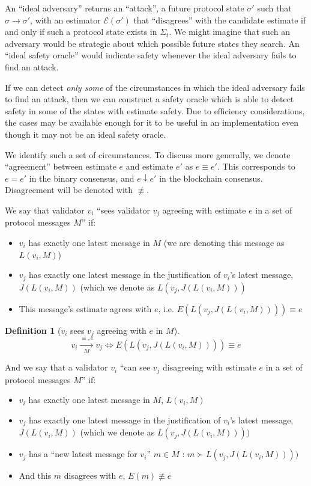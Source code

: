 \documentclass{article}
\theoremstyle{definition}
\newtheorem{defn}{Definition}[section]
\begin{document}
An ``ideal adversary'' returns an ``attack'', a future protocol state $\sigma'$ such that $\sigma \to \sigma'$, with an estimator $\mathcal{E}(\sigma')$ that ``disagrees'' with the candidate estimate if and only if such a protocol state exists in $\Sigma_t$. We might imagine that such an adversary would be strategic about which possible future states they search. An ``ideal safety oracle'' would indicate safety whenever the ideal adversary fails to find an attack.

If we can detect \emph{only some} of the circumstances in which the ideal adversary fails to find an attack, then we can construct a safety oracle which is able to detect safety in some of the states with estimate safety. Due to efficiency considerations, the cases may be available enough for it to be useful in an implementation even though it may not be an ideal safety oracle.

We identify such a set of circumstances. To discuss more generally, we denote ``agreement'' between estimate $e$ and estimate $e'$ as $e \equiv e'$. This corresponds to $e = e'$ in the binary consensus, and $e \downarrow e'$ in the blockchain consensus. Disagreement will be denoted with $\not\equiv$.

We say that validator $v_i$ ``sees validator $v_j$ agreeing with estimate $e$ in a set of protocol messages $M$'' if:
\begin{itemize}
\item $v_i$ has exactly one latest message in $M$ (we are denoting this message as $L(v_i, M)$)
\item $v_j$ has exactly one latest message in the justification of $v_i$'s latest message, $J(L(v_i, M))$ (which we denote as $L(v_j, J(L(v_i, M)))$
\item This message's estimate agrees with $e$, i.e. $E(L(v_j, J(L(v_i, M)))) \equiv e$
\end{itemize}

\begin{defn}[$v_i$ sees $v_j$ agreeing with $e$ in $M$]
$$
v_i \xrightarrow[\text{$M$}]{\text{$\equiv, e$}} v_j \iff E(L(v_j, J(L(v_i, M)))) \equiv e
$$
\end{defn}

And we say that a validator $v_i$ ``can see $v_j$ disagreeing with estimate $e$ in a set of protocol messages $M$'' if:
\begin{itemize}
\item $v_i$ has exactly one latest message in $M$, $L(v_i, M)$
\item $v_j$ has exactly one latest message in the justification of $v_i$'s latest message, $J(L(v_i, M))$ (which we denote as $L(v_j, J(L(v_i, M))))$
\item $v_j$ has a ``new latest message for $v_i$'' $m \in M$ : $m \succ L(v_j, J(L(v_i, M))))$
\item And this $m$ disagrees with $e$, $E(m) \not\equiv e$
\end{itemize}
\end{document}
